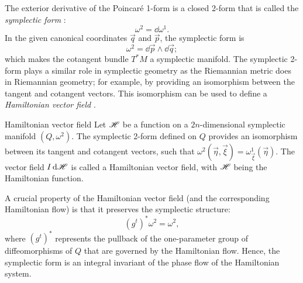 The exterior derivative of the Poincaré 1-form is a closed 2-form that is called the \emph{symplectic form} :
$$ \omega^2 = \dd{\omega^1}.$$
In the given canonical coordinates $\vec{q}$ and $\vec{p}$, the symplectic form is 
$$ \omega^2 = \dd{\vec{p}}\wedge\dd{\vec{q}}; $$
which makes the cotangent bundle $T^*M$ a symplectic manifold. The symplectic 2-form plays a similar role in symplectic geometry as the Riemannian metric does in Riemannian geometry; for example, by providing an isomorphism between the tangent and cotangent vectors. This isomorphism can be used to define a \emph{Hamiltonian vector field} \cite{Arnold1989}.
\begin{thmblock}{Hamiltonian vector field}
    Let $\mathscr{H}$ be a function on a $2n$-dimensional symplectic manifold $(Q, \omega^2)$. The symplectic 2-form defined on $Q$ provides an isomorphism  between its tangent and cotangent vectors, such that $\omega^2(\vec{\eta}, \vec{\xi}) = \omega^1_{\vec{\xi}}(\vec{\eta})$.  The vector field $I\dd{\ensuremath{\mathscr{H}}}$ is called a Hamiltonian vector field, with $\mathscr{H}$ being the Hamiltonian function.
\end{thmblock}
A crucial property of the Hamiltonian vector field (and the corresponding Hamiltonian flow) is that it preserves the symplectic structure: \cite{Arnold1989}
$$ (g^t)^* \omega^2  = \omega^2, $$
where $(g^t)^*$ represents the pullback of the one-parameter group of diffeomorphisms of $Q$ that are governed by the Hamiltonian flow. Hence, the symplectic form is an integral invariant of the phase flow of the Hamiltonian system.  

